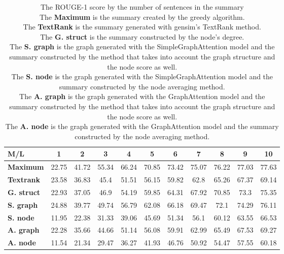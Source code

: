 \begin{table}[!ht]
	\centering
	\begin{tabular}{| l | c | c | c | c | c | c | c | c | c | c |}
		\hline
		\textbf{M/L}&\textbf{1}&\textbf{2}&\textbf{3}&\textbf{4}&\textbf{5}&\textbf{6}&\textbf{7}&\textbf{8}&\textbf{9}&\textbf{10} \\ \hline \hline
		\textbf{Maximum}&22.75&41.72&55.34&66.24&70.85&73.42&75.07&76.22&77.03&77.63 \\ \hline
		\textbf{Textrank}&23.58&36.83&45.4&51.51&56.15&59.82&62.8&65.26&67.37&69.14 \\ \hline
		\textbf{G. struct}&22.93&37.05&46.9&54.19&59.85&64.31&67.92&70.85&73.3&75.35 \\ \hline
		\textbf{S. graph}&24.88&39.77&49.74&56.79&62.08&66.18&69.47&72.1&74.29&76.11 \\ \hline
		\textbf{S. node}&11.95&22.38&31.33&39.06&45.69&51.34&56.1&60.12&63.55&66.53 \\ \hline
		\textbf{A. graph}&22.28&35.66&44.66&51.14&56.08&59.91&62.99&65.49&67.53&69.27 \\ \hline
		\textbf{A. node}&11.54&21.34&29.47&36.27&41.93&46.76&50.92&54.47&57.55&60.18 \\ \hline
	\end{tabular}
	\caption{The ROUGE-1 score by the number of sentences in the summary
		\\ The \textbf{Maximum} is the summary created by the greedy algorithm.
		\\ The \textbf{TextRank} is the summary generated with gensim's TextRank method. 
		\\The \textbf{G. struct} is the summary constructed by the node's degree.
		\\ The \textbf{S. graph} is the graph generated with the SimpleGraphAttention model and the summary constructed by the method that takes into account the graph structure and the node score as well.
		\\ The \textbf{S. node} is the graph generated with the SimpleGraphAttention model and the summary constructed by the node averaging method.
		\\ The \textbf{A. graph} is the graph generated with the GraphAttention model and the summary constructed by the method that takes into account the graph structure and the node score as well.
		\\ The \textbf{A. node} is the graph generated with the GraphAttention model and the summary constructed by the node averaging method.}
	\label{tab:ROUGE-1}
\end{table}

